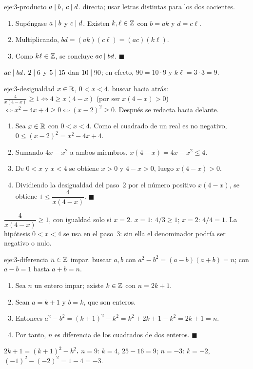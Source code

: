 \begin{solucion}{eje:3-producto}
\datos $a\mid b$, $c\mid d$.
\planteamiento directa; usar letras distintas para los dos cocientes.
\pasos
\begin{enumerate}[label=\arabic*.]
  \item Supóngase $a\mid b$ y $c\mid d$. Existen $k,\ell\in\mathbb{Z}$ con $b=ak$ y $d=c\ell$.
  \item Multiplicando, $bd=(ak)(c\ell)=(ac)(k\ell)$.
  \item Como $k\ell\in\mathbb{Z}$, se concluye $ac\mid bd$. $\blacksquare$
\end{enumerate}
\resultado \textbf{$ac\mid bd$.}
\comprobacion $2\mid 6$ y $5\mid 15$ dan $10\mid 90$; en efecto, $90=10\cdot 9$ y $k\ell=3\cdot 3=9$.
\end{solucion}

\begin{solucion}{eje:3-desigualdad}
\datos $x\in\mathbb{R}$, $0<x<4$.
\planteamiento buscar hacia atrás: $\frac{4}{x(4-x)}\ge 1\iff 4\ge x(4-x)$ (por ser $x(4-x)>0$) $\iff x^{2}-4x+4\ge 0\iff(x-2)^{2}\ge 0$. Después se redacta hacia delante.
\pasos
\begin{enumerate}[label=\arabic*.]
  \item Sea $x\in\mathbb{R}$ con $0<x<4$. Como el cuadrado de un real es no negativo, $0\le(x-2)^{2}=x^{2}-4x+4$.
  \item Sumando $4x-x^{2}$ a ambos miembros, $x(4-x)=4x-x^{2}\le 4$.
  \item De $0<x$ y $x<4$ se obtiene $x>0$ y $4-x>0$, luego $x(4-x)>0$.
  \item Dividiendo la desigualdad del paso~2 por el número positivo $x(4-x)$, se obtiene $1\le\dfrac{4}{x(4-x)}$. $\blacksquare$
\end{enumerate}
\resultado \textbf{$\dfrac{4}{x(4-x)}\ge 1$}, con igualdad solo si $x=2$.
\comprobacion $x=1$: $4/3\ge 1$; $x=2$: $4/4=1$. La hipótesis $0<x<4$ se usa en el paso~3: sin ella el denominador podría ser negativo o nulo.
\end{solucion}

\begin{solucion}{eje:3-diferencia}
\datos $n\in\mathbb{Z}$ impar.
\planteamiento buscar $a,b$ con $a^{2}-b^{2}=(a-b)(a+b)=n$; con $a-b=1$ basta $a+b=n$.
\pasos
\begin{enumerate}[label=\arabic*.]
  \item Sea $n$ un entero impar; existe $k\in\mathbb{Z}$ con $n=2k+1$.
  \item Sean $a=k+1$ y $b=k$, que son enteros.
  \item Entonces $a^{2}-b^{2}=(k+1)^{2}-k^{2}=k^{2}+2k+1-k^{2}=2k+1=n$.
  \item Por tanto, $n$ es diferencia de los cuadrados de dos enteros. $\blacksquare$
\end{enumerate}
\resultado \textbf{$2k+1=(k+1)^{2}-k^{2}$.}
\comprobacion $n=9$: $k=4$, $25-16=9$; $n=-3$: $k=-2$, $(-1)^{2}-(-2)^{2}=1-4=-3$.
\end{solucion}

